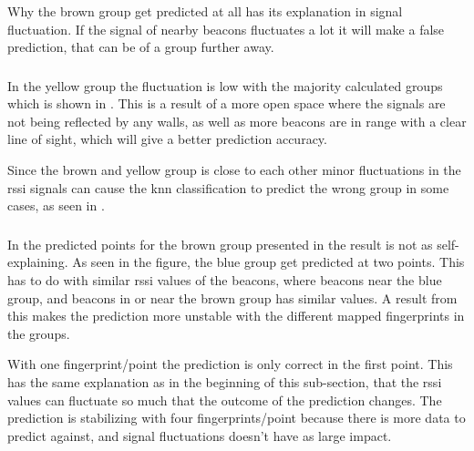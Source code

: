 \bigskip

Why the brown group get predicted at all has its explanation in signal fluctuation.
If the signal of nearby beacons fluctuates a lot it will make a false prediction, that can be of a group further away.


\subsubsection{}\label{sec:resultsPerPointYellow}
In the yellow group the fluctuation is low with the majority calculated groups which is shown in .
This is a result of a more open space where the signals are not being reflected by any walls, as well as more beacons are in range with a clear line of sight, which will give a better prediction accuracy.


Since the brown and yellow group is close to each other minor fluctuations in the \acrshort{rssi} signals can cause the \acrshort{knn} classification to predict the wrong group in some cases, as seen in .


\subsubsection{}\label{sec:resultsPerPointBrown}
In the predicted points for the brown group presented in  the result is not as self-explaining.
As seen in the figure, the blue group get predicted at two points.
This has to do with similar \acrshort{rssi} values of the beacons, where beacons near the blue group, and beacons in or near the brown group has similar values.
A result from this makes the prediction more unstable with the different mapped fingerprints in the groups.


With one fingerprint/point the prediction is only correct in the first point.
This has the same explanation as in the beginning of this sub-section, that the \acrshort{rssi} values can fluctuate so much that the outcome of the prediction changes.
The prediction is stabilizing with four fingerprints/point because there is more data to predict against, and signal fluctuations doesn't have as large impact.


